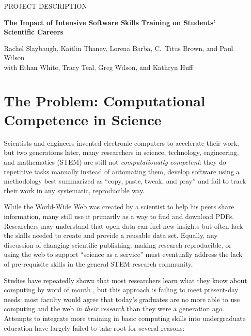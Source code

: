 \documentclass{proposalnsf}
\newlength{\up}
\begin{document}
\newpage

\pagestyle{plain}
\renewcommand{\thepage} {\arabic{page}}

\begin{center}
\small{PROJECT DESCRIPTION}


\large\textbf{The Impact of Intensive Software Skills Training on Students' Scientific Careers}

{\large \sf Rachel Slaybaugh, Kaitlin Thaney, Lorena Barba, C.\ Titus Brown, and Paul Wilson\\ 
  with Ethan White, Tracy Teal, Greg Wilson, and Kathryn Huff}

\end{center}

\section{The Problem: Computational Competence in Science}

Scientists and engineers invented electronic computers to accelerate
their work, but two generations later, many researchers in science,
technology, engineering, and mathematics (STEM) are still not
\emph{computationally competent}: they do repetitive tasks manually
instead of automating them, develop software using a methodology best
summarized as ``copy, paste, tweak, and pray'' and fail to track
their work in any systematic, reproducible way.

While the World-Wide Web was created by a scientist to help his
peers share information, many still use it primarily as a way to find
and download PDFs.  Researchers may understand that open data can fuel
new insights but often lack the skills needed to create and provide a
reusable data set.  Equally, any discussion of changing scientific
publishing, making research reproducible, or using the web to support
``science as a service'' must eventually address the lack of
pre-requisite skills in the general STEM research community.

Studies have repeatedly shown that most researchers learn what they
know about computing by word of mouth \cite{hannay2009}, but this
approach is failing to meet present-day needs: most faculty would
agree that today's graduates are no more able to use computing and the
web \emph{in their research} than they were a generation ago.
Attempts to integrate more training in basic computing skills into
undergraduate education have largely failed to take root for several
reasons:
\end{document}
